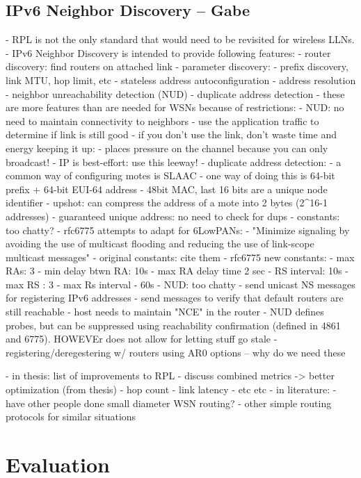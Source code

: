 \documentclass[conference]{IEEEtran}
\begin{document}
\subsection{IPv6 Neighbor Discovery -- Gabe }
- RPL is not the only standard that would need to be revisited for wireless LLNs.
- IPv6 Neighbor Discovery is intended to provide following features:
    - router discovery: find routers on attached link
    - parameter discovery:
        - prefix discovery, link MTU, hop limit, etc
    - stateless address autoconfiguration
    - address resolution
    - neighbor unreachability detection (NUD)
    - duplicate address detection
- these are more features than are needed for WSNs because of restrictions:
    - NUD: no need to maintain connectivity to neighbors
        - use the application traffic to determine if link is still good
        - if you don't use the link, don't waste time and energy keeping it up:
            - places pressure on the channel because you can only broadcast!
        - IP is best-effort: use this leeway!
    - duplicate address detection:
        - a common way of configuring motes is SLAAC
        - one way of doing this is 64-bit prefix + 64-bit EUI-64 address
        - 48bit MAC, last 16 bits are a unique node identifier
        - upshot: can compress the address of a mote into 2 bytes (2^16-1 addresses)
        - guaranteed unique address: no need to check for dups
- constants: too chatty?
    - rfc6775 attempts to adapt for 6LowPANs:
    - "Minimize signaling by avoiding the use of multicast
      flooding and reducing the use of link-scope multicast messages"
    - original constants: cite them
    - rfc6775 new constants:
        - max RAs: 3
        - min delay btwn RA: 10s
        - max RA delay time 2 sec
        - RS interval: 10s
        - max RS : 3
        - max Rs interval - 60s
- NUD: too chatty
    - send unicast NS messages for registering IPv6 addresses
    - send messages to verify that default routers are still reachable
    - host needs to maintain "NCE" in the router
    - NUD defines probes, but can be suppressed using reachability confirmation
      (defined in 4861 and 6775). HOWEVEr does not allow for letting stuff go stale
    - registering/deregestering w/ routers using AR0 options -- why do we need these
\fi


- in thesis: list of improvements to RPL
    - discuss combined metrics -> better optimization (from thesis)
        - hop count
        - link latency
        - etc etc
- in literature:
    - have other people done small diameter WSN routing?
    - other simple routing protocols for similar situations
\fi





\section{Evaluation} \label{section:evaluation}



\end{document}
